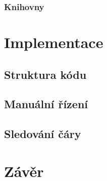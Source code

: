 \subsection*{Knihovny}




\chapter{Implementace} %
\section{Struktura kódu}
\section{Manuální řízení}
\section{Sledování čáry}

\chapter{Závěr}



%
